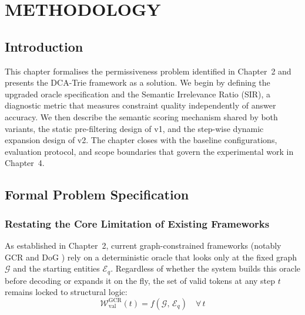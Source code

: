
\chapter{METHODOLOGY}
\label{Chapter3}

\section{Introduction}
\label{sec:ch3intro}

This chapter formalises the permissiveness problem identified in Chapter~2 and presents the DCA-Trie framework as a solution. We begin by defining the upgraded oracle specification and the Semantic Irrelevance Ratio (SIR), a diagnostic metric that measures constraint quality independently of answer accuracy. We then describe the semantic scoring mechanism shared by both variants, the static pre-filtering design of v1, and the step-wise dynamic expansion design of v2. The chapter closes with the baseline configurations, evaluation protocol, and scope boundaries that govern the experimental work in Chapter~4.

\section{Formal Problem Specification}
\label{sec:ch3problem}

\subsection{Restating the Core Limitation of Existing Frameworks}

As established in Chapter~2, current graph-constrained frameworks (notably GCR \citep{luo2025-graph-constrained-reasoning} and DoG \citep{li2024-decoding-on-graphs}) rely on a deterministic oracle that looks only at the fixed graph $\mathcal{G}$ and the starting entities $\mathcal{E}_q$. Regardless of whether the system builds this oracle before decoding or expands it on the fly, the set of valid tokens at any step $t$ remains locked to structural logic:
\begin{equation}
  \mathcal{W}_{\text{val}}^{\text{GCR}}(t) = f(\mathcal{G},\, \mathcal{E}_q)
  \quad \forall\, t
  \label{eq:gcr_oracle}
\end{equation}

